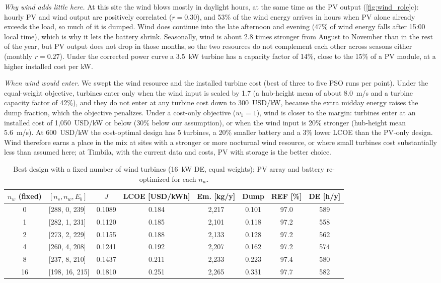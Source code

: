 \documentclass[final,3p,times]{elsarticle}
\begin{document}
\textit{Why wind adds little here.} At this site the wind blows mostly in daylight hours, at the same time as the PV output (\cref{fig:wind_role}c): hourly PV and wind output are positively correlated ($r = 0.30$), and 53\% of the wind energy arrives in hours when PV alone already exceeds the load, so much of it is dumped. Wind does continue into the late afternoon and evening (47\% of wind energy falls after 15:00 local time), which is why it lets the battery shrink. Seasonally, wind is about 2.8 times stronger from August to November than in the rest of the year, but PV output does not drop in those months, so the two resources do not complement each other across seasons either (monthly $r = 0.27$). Under the corrected power curve a 3.5~kW turbine has a capacity factor of 14\%, close to the 15\% of a PV module, at a higher installed cost per kW.

\textit{When wind would enter.} We swept the wind resource and the installed turbine cost (best of three to five PSO runs per point). Under the equal-weight objective, turbines enter only when the wind input is scaled by 1.7 (a hub-height mean of about 8.0~m/s and a turbine capacity factor of 42\%), and they do not enter at any turbine cost down to 300~USD/kW, because the extra midday energy raises the dump fraction, which the objective penalizes. Under a cost-only objective ($w_1 = 1$), wind is closer to the margin: turbines enter at an installed cost of 1,050~USD/kW or below (30\% below our assumption), or when the wind input is 20\% stronger (hub-height mean 5.6~m/s). At 600~USD/kW the cost-optimal design has 5 turbines, a 20\% smaller battery and a 3\% lower LCOE than the PV-only design. Wind therefore earns a place in the mix at sites with a stronger or more nocturnal wind resource, or where small turbines cost substantially less than assumed here; at Timbila, with the current data and costs, PV with storage is the better choice.

\begin{table}[htbp]
\centering
\small
\begin{tabular}{c l c c c c c c}
\toprule
\textbf{$n_w$ (fixed)} & \textbf{$[n_s, n_w, E_b]$} & \textbf{$J$} & \textbf{LCOE [USD/kWh]} & \textbf{Em. [kg/y]} & \textbf{Dump} & \textbf{REF [\%]} & \textbf{DE [h/y]} \\
\midrule
0 & [288, 0, 239] & 0.1089 & 0.184 & 2,217 & 0.101 & 97.0 & 589 \\
1 & [282, 1, 231] & 0.1120 & 0.185 & 2,101 & 0.118 & 97.2 & 558 \\
2 & [273, 2, 229] & 0.1155 & 0.188 & 2,133 & 0.128 & 97.2 & 562 \\
4 & [260, 4, 208] & 0.1241 & 0.192 & 2,207 & 0.162 & 97.2 & 574 \\
8 & [237, 8, 210] & 0.1437 & 0.211 & 2,233 & 0.223 & 97.4 & 580 \\
16 & [198, 16, 215] & 0.1810 & 0.251 & 2,265 & 0.331 & 97.7 & 582 \\
\bottomrule
\end{tabular}
\caption{\label{tab:wind_forced} Best design with a fixed number of wind turbines (16~kW DE, equal weights); PV array and battery re-optimized for each $n_w$.}
\end{table}
\end{document}
